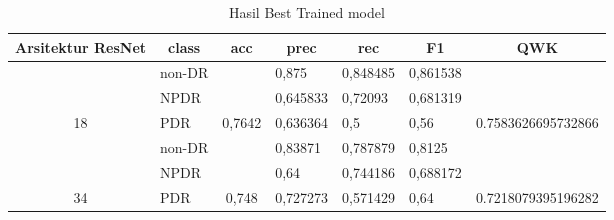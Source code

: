 \begin{table}[hbtp]
	\begin{center}
		\caption{Hasil Best Trained model}
		\label{tb:HasilTrainDefault}
		\begin{tabular}{|c|l|c|l|l|l|c|}
			\hline
			\rowcolor[HTML]{C0C0C0} 
			Arsitektur ResNet   & \multicolumn{1}{c|}{\cellcolor[HTML]{C0C0C0}class} & acc                      & \multicolumn{1}{c|}{\cellcolor[HTML]{C0C0C0}prec} & \multicolumn{1}{c|}{\cellcolor[HTML]{C0C0C0}rec} & \multicolumn{1}{c|}{\cellcolor[HTML]{C0C0C0}F1} & QWK                                  \\ \hline
			& non-DR                                             &                          & 0,875                                             & 0,848485                                         & 0,861538                                        &                                      \\ \cline{2-2} \cline{4-6}
			& NPDR                                               &                          & 0,645833                                          & 0,72093                                          & 0,681319                                        &                                      \\ \cline{2-2} \cline{4-6}
			\multirow{-3}{*}{18}  & PDR                                                & \multirow{-3}{*}{0,7642} & 0,636364                                          & 0,5                                              & 0,56                                            & \multirow{-3}{*}{0.7583626695732866} \\ \hline
			& non-DR                                             &                          & 0,83871                                           & 0,787879                                         & 0,8125                                          &                                      \\ \cline{2-2} \cline{4-6}
			& NPDR                                               &                          & 0,64                                              & 0,744186                                         & 0,688172                                        &                                      \\ \cline{2-2} \cline{4-6}
			\multirow{-3}{*}{34}  & PDR                                                & \multirow{-3}{*}{0,748}  & 0,727273                                          & 0,571429                                         & 0,64                                            & \multirow{-3}{*}{0.7218079395196282} \\ \hline

\end{tabular}
\end{center}
\end{table}
